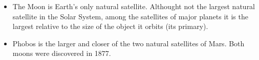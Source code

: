 \begin{itemize}
	\item The Moon is Earth's only natural satellite. Althought not the
	largest natural satellite in the Solar System, among the satellites
	of major planets it is the largest relative to the size
	of the object it orbits (its primary).

	\item Phobos is the larger and closer of the two natural
	satellites of Mars. Both moons were discovered in 1877.
\end{itemize}
